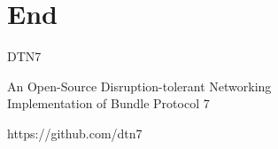 \section{End}

\begin{frame}
\begin{center}
  \Large{DTN7}

  \large{An Open-Source Disruption-tolerant Networking \\ Implementation of Bundle Protocol 7}
\end{center}

\begin{center}
  \Large{https://github.com/dtn7}
\end{center}
\end{frame}
